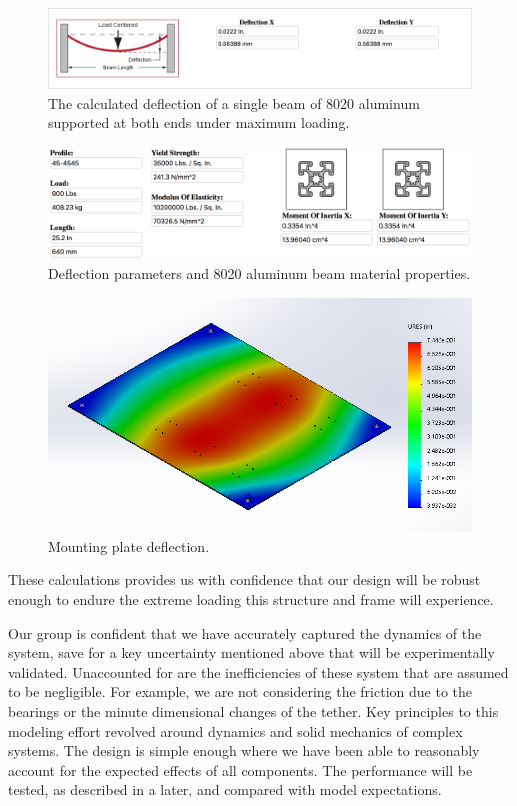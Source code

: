 \begin{figure}[ht]
 \centering
 \includegraphics[width=1\textwidth]{TUMBR/8020Deflection1.png}
 \caption{\label{fig:8020Deflection1} The calculated deflection of a single beam of 8020 aluminum supported at both ends under maximum loading.}
\end{figure}

\begin{figure}[ht]
 \centering
 \includegraphics[width=1\textwidth]{TUMBR/8020Deflection2.png}
 \caption{\label{fig:8020Deflection2} Deflection parameters and 8020 aluminum beam material properties.}
\end{figure}

\begin{figure}[ht]
 \centering
 \includegraphics[width=1\textwidth]{TUMBR/Platedeflect.PNG}
 \caption{\label{fig:Platedeflect} Mounting plate deflection.}
\end{figure}

These calculations provides us with confidence that our design will be robust enough to endure the extreme loading this structure and frame will experience.

\indent\indent Our group is confident that we have accurately captured the dynamics of the system, save for a key uncertainty mentioned above that will be experimentally validated. Unaccounted for are the inefficiencies of these system that are assumed to be negligible. For example, we are not considering the friction due to the bearings or the minute dimensional changes of the tether. Key principles to this modeling effort revolved around dynamics and solid mechanics of complex systems. The design is simple enough where we have been able to reasonably account for the expected effects of all components. The performance will be tested, as described in a later, and compared with model expectations.  

